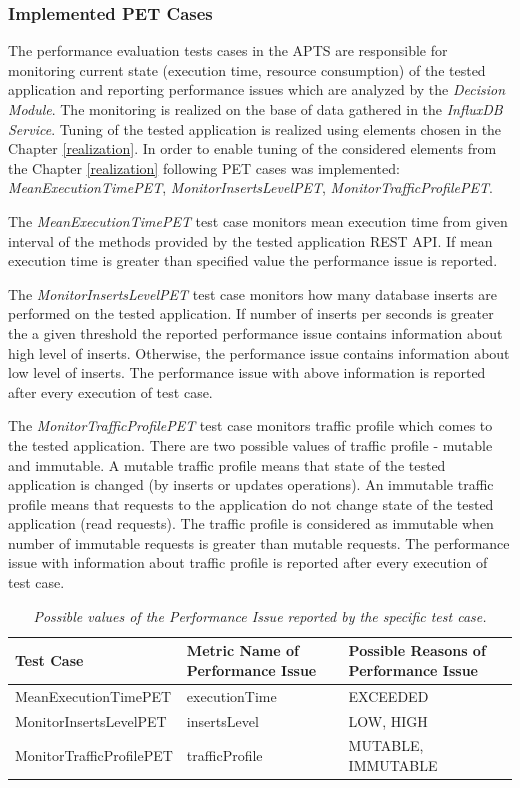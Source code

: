 \documentclass[12pt,a4paper]{article}
\begin{document}
\subsubsection{Implemented PET Cases} \label{dm}

 The performance evaluation tests cases in the APTS are responsible for monitoring current state (execution time, resource consumption) of the tested application and reporting performance issues which are analyzed by the \textit{Decision Module}. The monitoring is realized on the base of data gathered in the \textit{InfluxDB Service}.  Tuning of the tested application is realized using elements chosen in the Chapter \ref{realization}. In order to enable tuning of the considered elements from the Chapter \ref{realization} following PET cases was implemented: \textit{MeanExecutionTimePET}, \textit{MonitorInsertsLevelPET},  \textit{MonitorTrafficProfilePET}.
 
 The \textit{MeanExecutionTimePET} test case monitors mean execution time from given interval of the methods provided by the tested application REST API. If mean execution time is greater than specified value the performance issue is reported. 

The \textit{MonitorInsertsLevelPET} test case monitors how many database inserts are performed on the tested application. If number of inserts per seconds is greater the a given threshold the reported performance issue contains information about high level of inserts. Otherwise, the performance issue contains information about low level of inserts. The performance issue with above information is reported after every execution of test case. 

The \textit{MonitorTrafficProfilePET} test case monitors traffic profile which comes to the tested application. There are two possible values of traffic profile - mutable and immutable. A mutable traffic profile means that state of the tested application is changed (by inserts or updates operations). An immutable traffic profile means that requests to the application do not change state of the tested application (read requests). The traffic profile is considered as immutable when number of immutable requests is greater than mutable requests. The performance issue with information about traffic profile is reported after every execution of test case.

\begin{table}[!htb]
\def\arraystretch{1.5}
\caption{\textit{Possible values of the Performance Issue reported by the specific test case.}}\label{testcasescomp}
\begin{tabularx}{\textwidth}{X|X|p{3.8cm}}
\textbf{Test Case} & \textbf{Metric Name of Performance Issue} & \textbf{Possible Reasons of Performance Issue} \\ \hline
MeanExecutionTimePET & executionTime & EXCEEDED \\\hline
MonitorInsertsLevelPET & insertsLevel &LOW, HIGH \\\hline
MonitorTrafficProfilePET & trafficProfile & MUTABLE, IMMUTABLE \\
\end{tabularx}
\end{table}
\end{document}
